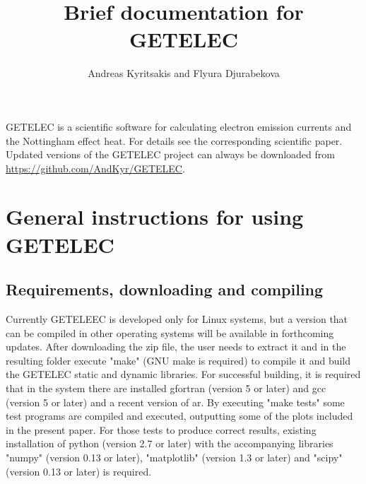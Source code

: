 \documentclass[notitlepage]{revtex4-1}
\begin{document}
\title{Brief documentation for GETELEC}

\author{Andreas Kyritsakis and Flyura Djurabekova}


\maketitle

GETELEC is a scientific software for calculating electron emission currents and the Nottingham effect heat. For details see the corresponding scientific paper. Updated versions of the GETELEC project can always be downloaded from \url{https://github.com/AndKyr/GETELEC}.

\section{General instructions for using GETELEC}
\label{sec:Gen}

\subsection{Requirements, downloading and compiling}

Currently GETELEEC is developed only for Linux systems, but a version that can be compiled in other operating systems will be available in forthcoming updates. After downloading the zip file, the user needs to extract it and in the resulting folder execute "make" (GNU make is required) to compile it and build the GETELEC static and dynamic libraries. For successful building, it is required that in the system there are installed gfortran (version 5 or later) and gcc (version 5 or later) and a recent version of ar. By executing "make tests" some test programs are compiled and executed, outputting some of the plots included in the present paper. For those tests to produce correct results, existing installation of python (version 2.7 or later) with the accompanying libraries "numpy" (version 0.13 or later), "matplotlib" (version 1.3 or later) and "scipy" (version 0.13 or later) is required.
\end{document}
